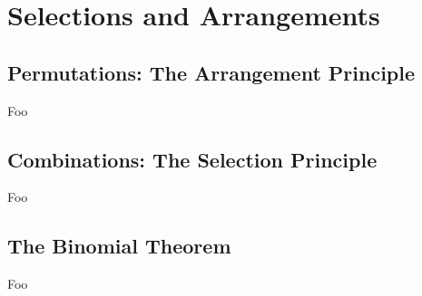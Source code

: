 \section{Selections and Arrangements}

\subsection{Permutations: The Arrangement Principle}

Foo

\subsection{Combinations: The Selection Principle}

Foo

\subsection{The Binomial Theorem}

Foo

